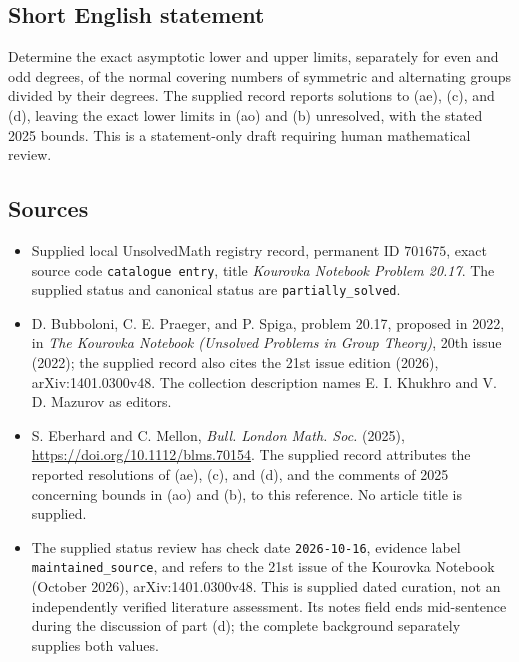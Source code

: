 \documentclass[11pt]{article}
\begin{document}
\subsection{Short English statement}
Determine the exact asymptotic lower and upper limits, separately for even and odd degrees, of the normal covering numbers of symmetric and alternating groups divided by their degrees. The supplied record reports solutions to (ae), (c), and (d), leaving the exact lower limits in (ao) and (b) unresolved, with the stated 2025 bounds. This is a statement-only draft requiring human mathematical review.
\subsection{Sources}
\begin{itemize}
\item Supplied local UnsolvedMath registry record, permanent ID \(701675\), exact source code \texttt{catalogue entry}, title \emph{Kourovka Notebook Problem 20.17}. The supplied status and canonical status are \texttt{partially\_solved}.
\item D. Bubboloni, C. E. Praeger, and P. Spiga, problem 20.17, proposed in 2022, in \emph{The Kourovka Notebook (Unsolved Problems in Group Theory)}, 20th issue (2022); the supplied record also cites the 21st issue edition (2026), arXiv:1401.0300v48. The collection description names E. I. Khukhro and V. D. Mazurov as editors.
\item S. Eberhard and C. Mellon, \emph{Bull. London Math. Soc.} (2025), \url{https://doi.org/10.1112/blms.70154}. The supplied record attributes the reported resolutions of (ae), (c), and (d), and the comments of 2025 concerning bounds in (ao) and (b), to this reference. No article title is supplied.
\item The supplied status review has check date \texttt{2026-10-16}, evidence label \texttt{maintained\_source}, and refers to the 21st issue of the Kourovka Notebook (October 2026), arXiv:1401.0300v48. This is supplied dated curation, not an independently verified literature assessment. Its notes field ends mid-sentence during the discussion of part (d); the complete background separately supplies both values.
\end{itemize}
\end{document}
